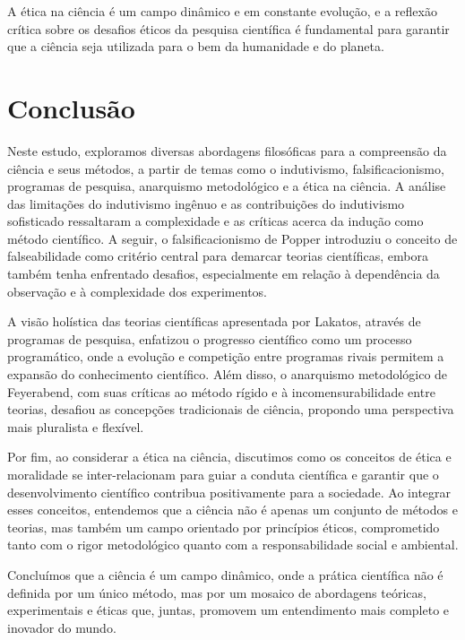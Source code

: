 \documentclass{article} %
\begin{document}
A ética na ciência é um campo dinâmico e em constante evolução, e a reflexão crítica sobre os desafios éticos da pesquisa científica é fundamental para garantir que a ciência seja utilizada para o bem da humanidade e do planeta.



\section{Conclusão}

Neste estudo, exploramos diversas abordagens filosóficas para a compreensão da ciência e seus métodos, a partir de temas como o indutivismo, falsificacionismo, programas de pesquisa, anarquismo metodológico e a ética na ciência. A análise das limitações do indutivismo ingênuo e as contribuições do indutivismo sofisticado ressaltaram a complexidade e as críticas acerca da indução como método científico. A seguir, o falsificacionismo de Popper introduziu o conceito de falseabilidade como critério central para demarcar teorias científicas, embora também tenha enfrentado desafios, especialmente em relação à dependência da observação e à complexidade dos experimentos.

A visão holística das teorias científicas apresentada por Lakatos, através de programas de pesquisa, enfatizou o progresso científico como um processo programático, onde a evolução e competição entre programas rivais permitem a expansão do conhecimento científico. Além disso, o anarquismo metodológico de Feyerabend, com suas críticas ao método rígido e à incomensurabilidade entre teorias, desafiou as concepções tradicionais de ciência, propondo uma perspectiva mais pluralista e flexível.

Por fim, ao considerar a ética na ciência, discutimos como os conceitos de ética e moralidade se inter-relacionam para guiar a conduta científica e garantir que o desenvolvimento científico contribua positivamente para a sociedade. Ao integrar esses conceitos, entendemos que a ciência não é apenas um conjunto de métodos e teorias, mas também um campo orientado por princípios éticos, comprometido tanto com o rigor metodológico quanto com a responsabilidade social e ambiental.

Concluímos que a ciência é um campo dinâmico, onde a prática científica não é definida por um único método, mas por um mosaico de abordagens teóricas, experimentais e éticas que, juntas, promovem um entendimento mais completo e inovador do mundo.
\end{document}
